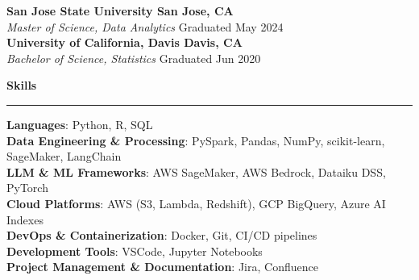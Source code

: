 \documentclass[letterpaper,10pt]{article}
\newcommand{\resumesection}[1]{
  \vspace{4pt}
  \noindent\textbf{\Large #1} \\
  \noindent\rule{\linewidth}{0.2pt}
  \vspace{-4pt}
}
\begin{document}
\textbf{San Jose State University \hfill San Jose, CA} \\
\textit{Master of Science, Data Analytics} \hfill Graduated May 2024 \\

\textbf{University of California, Davis \hfill Davis, CA} \\
\textit{Bachelor of Science, Statistics} \hfill Graduated Jun 2020

\resumesection{Skills}

\begin{itemize}[leftmargin=0.15in, label={}, itemsep=0pt, parsep=0pt, topsep=0pt]
    \small{\item{
    \textbf{Languages}{: Python, R, SQL} \\
    \textbf{Data Engineering \& Processing}{: PySpark, Pandas, NumPy, scikit-learn, SageMaker, LangChain} \\
    \textbf{LLM \& ML Frameworks}{: AWS SageMaker, AWS Bedrock, Dataiku DSS, PyTorch} \\
    \textbf{Cloud Platforms}{: AWS (S3, Lambda, Redshift), GCP BigQuery, Azure AI Indexes} \\
    \textbf{DevOps \& Containerization}{: Docker, Git, CI/CD pipelines} \\
    \textbf{Development Tools}{: VSCode, Jupyter Notebooks} \\
    \textbf{Project Management \& Documentation}{: Jira, Confluence}
    }}
\end{itemize}
\end{document}
